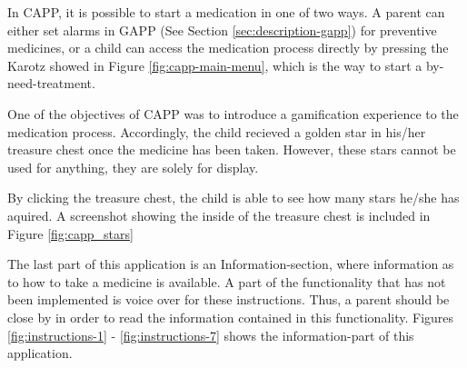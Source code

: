 In CAPP, it is possible to start a medication in one of two ways. A parent can either set alarms in GAPP (See Section \ref{sec:description-gapp}) for preventive medicines, or a child can access the medication process directly by pressing the Karotz showed in Figure \ref{fig:capp-main-menu}, which is the way to start a by-need-treatment. 


One of the objectives of CAPP was to introduce a gamification experience to the medication process. Accordingly, the child recieved a golden star in his/her treasure chest once the medicine has been taken. However, these stars cannot be used for anything, they are solely for display.
  

By clicking the treasure chest, the child is able to see how many stars he/she has aquired. A screenshot showing the inside of the treasure chest is included in Figure \ref{fig:capp_stars} 


The last part of this application is an Information-section, where information as to how to take a medicine is available. A part of the functionality that has not been implemented is voice over for these instructions. Thus, a parent should be close by in order to read the information contained in this functionality.     
Figures \ref{fig:instructions-1} - \ref{fig:instructions-7} shows the information-part of this application.



